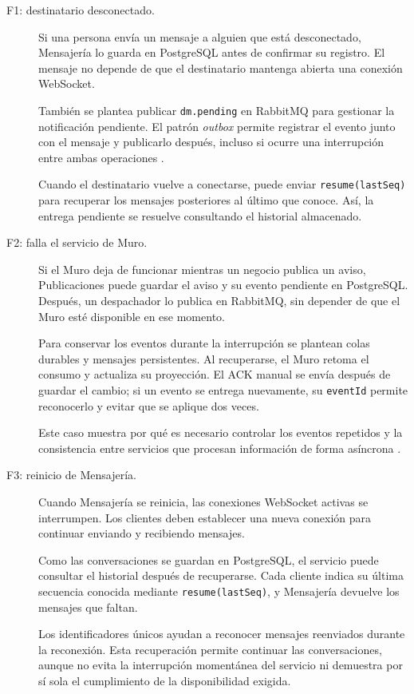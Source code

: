 \documentclass[12pt,a4paper]{article}
\begin{document}
\begin{description}

\item[F1: destinatario desconectado.]

Si una persona envía un mensaje a alguien que está desconectado,
Mensajería lo guarda en PostgreSQL antes de confirmar su registro.
El mensaje no depende de que el destinatario mantenga abierta una
conexión WebSocket.

También se plantea publicar \texttt{dm.pending} en RabbitMQ para
gestionar la notificación pendiente. El patrón \textit{outbox}
permite registrar el evento junto con el mensaje y publicarlo
después, incluso si ocurre una interrupción entre ambas
operaciones \cite{gupta2025outbox}.

Cuando el destinatario vuelve a conectarse, puede enviar
\texttt{resume(lastSeq)} para recuperar los mensajes posteriores
al último que conoce. Así, la entrega pendiente se resuelve
consultando el historial almacenado.

\item[F2: falla el servicio de Muro.]

Si el Muro deja de funcionar mientras un negocio publica un
aviso, Publicaciones puede guardar el aviso y su evento pendiente
en PostgreSQL. Después, un despachador lo publica en RabbitMQ,
sin depender de que el Muro esté disponible en ese momento.

Para conservar los eventos durante la interrupción se plantean
colas durables y mensajes persistentes. Al recuperarse, el Muro
retoma el consumo y actualiza su proyección. El ACK manual se
envía después de guardar el cambio; si un evento se entrega
nuevamente, su \texttt{eventId} permite reconocerlo y evitar
que se aplique dos veces.

Este caso muestra por qué es necesario controlar los eventos
repetidos y la consistencia entre servicios que procesan
información de forma asíncrona \cite{bacao2026consistency}.

\item[F3: reinicio de Mensajería.]

Cuando Mensajería se reinicia, las conexiones WebSocket activas
se interrumpen. Los clientes deben establecer una nueva conexión
para continuar enviando y recibiendo mensajes.

Como las conversaciones se guardan en PostgreSQL, el servicio
puede consultar el historial después de recuperarse. Cada cliente
indica su última secuencia conocida mediante
\texttt{resume(lastSeq)}, y Mensajería devuelve los mensajes
que faltan.

Los identificadores únicos ayudan a reconocer mensajes
reenviados durante la reconexión. Esta recuperación permite
continuar las conversaciones, aunque no evita la interrupción
momentánea del servicio ni demuestra por sí sola el cumplimiento
de la disponibilidad exigida.

\end{description}
\end{document}
